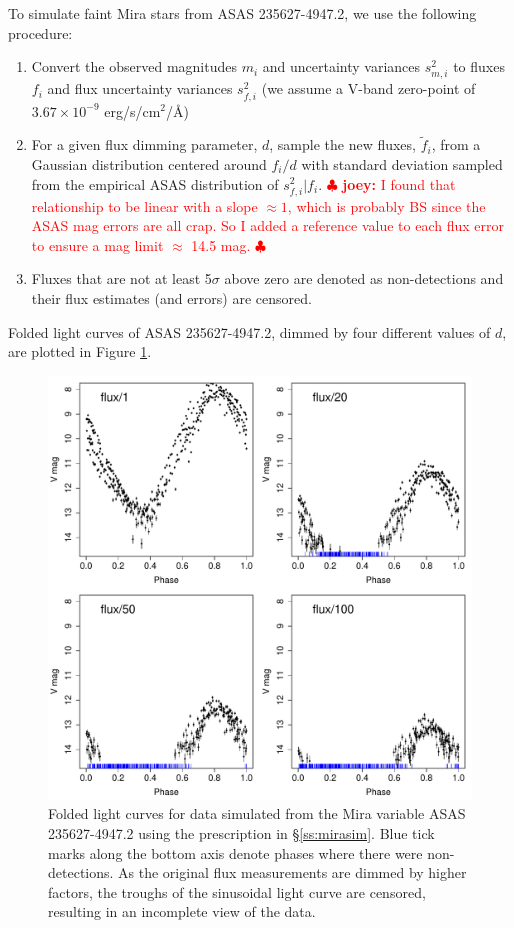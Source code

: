 \documentclass[12pt,preprint]{aastex}
\newcommand{\joey}[1] { \textcolor{red} {
\ensuremath{\clubsuit} {\bf joey:}  {#1}
\ensuremath{\clubsuit} } }%
\begin{document}
To simulate faint Mira stars from ASAS 235627-4947.2, we use the following procedure:
\begin{enumerate}
\item Convert the observed magnitudes $m_i$ and uncertainty variances $s^2_{m,i}$ to fluxes $f_i$ and flux uncertainty variances $s^2_{f,i}$ (we assume a V-band zero-point of $3.67\times10^{-9}$ erg/s/cm$^2$/\AA)
\item For a given flux dimming parameter, $d$, sample the new fluxes, $\tilde{f}_i$, from a Gaussian distribution centered around $f_i / d$ with standard deviation sampled from the empirical ASAS distribution of $s^2_{f,i} | f_i$. \joey{I found that relationship to be linear with a slope $\approx 1$, which is probably BS since the ASAS mag errors are all crap.  So I added a reference value to each flux error to ensure a mag limit $\approx$ 14.5 mag.}
\item Fluxes that are not at least 5$\sigma$ above zero are denoted as non-detections and their flux estimates (and errors) are censored.
\end{enumerate}
Folded light curves of ASAS 235627-4947.2, dimmed by four different values of $d$, are plotted in Figure \ref{fig:mirasim}.


\begin{figure}
\begin{center}
\includegraphics[angle=0,width=6.5in]{../plots/mira_simulated.pdf}
\end{center}
\caption{ Folded light curves for data simulated from the Mira variable ASAS 235627-4947.2 using the prescription in \S\ref{ss:mirasim}.  Blue tick marks along the bottom axis denote phases where there were non-detections.  As the original flux measurements are dimmed by higher factors, the troughs of the sinusoidal light curve are censored, resulting in an incomplete view of the data.  \label{fig:mirasim}}
\end{figure}
\end{document}
